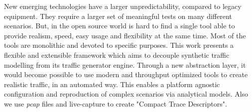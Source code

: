 New emerging technologies have a larger unpredictability, compared to legacy equipment. They require a larger set of meaningful tests on many different scenarios. But, in the open source world is hard to find a single tool able to provide realism, speed, easy usage and flexibility at the same time.  Most of the tools are monolithic and devoted to specific purposes. This work presents a flexible and extensible framework which aims to decouple synthetic traffic modelling from its traffic generator engine. Through a new abstraction layer, it would become possible to use modern and throughput optimized tools to create realistic traffic, in an automated way. This enables a platform agnostic configuration and reproduction of complex scenarios via analytical models. Also we use \textit{pcap} files and live-capture to create "Compact Trace Descriptors". 